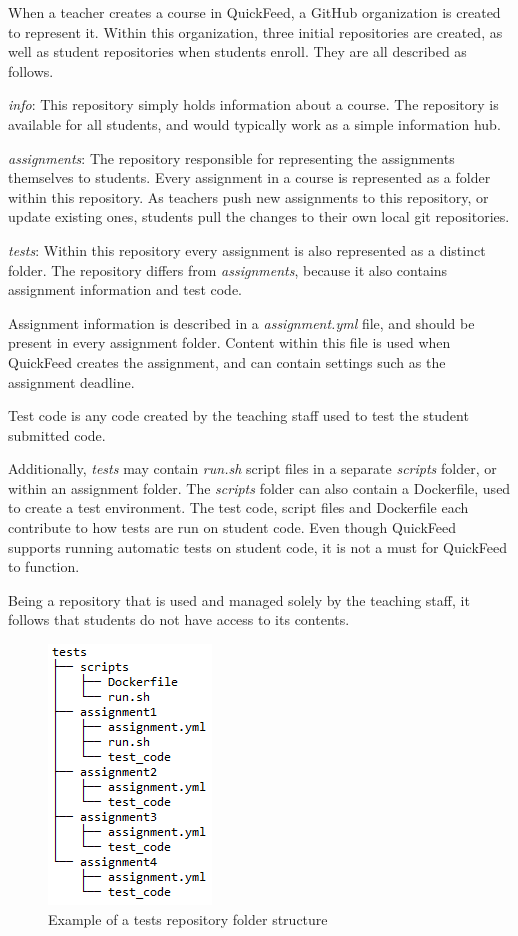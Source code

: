 When a teacher creates a course in QuickFeed, a GitHub organization is created to represent it.
Within this organization, three initial repositories are created, as well as student repositories when students enroll.
They are all described as follows.

\textit{info}: This repository simply holds information about a course.
The repository is available for all students, and would typically work as a simple information hub.

\textit{assignments}: The repository responsible for representing the assignments themselves to students.
Every assignment in a course is represented as a folder within this repository.
As teachers push new assignments to this repository, or update existing ones, students pull the changes to their own local git repositories.

\textit{tests}: Within this repository every assignment is also represented as a distinct folder.
The repository differs from \textit{assignments}, because it also contains assignment information and test code.

Assignment information is described in a \textit{assignment.yml} file, and should be present in every assignment folder.
Content within this file is used when QuickFeed creates the assignment, and can contain settings such as the assignment deadline.

Test code is any code created by the teaching staff used to test the student submitted code.

Additionally, \textit{tests} may contain \textit{run.sh} script files in a separate \textit{scripts} folder, or within an assignment folder.
The \textit{scripts} folder can also contain a Dockerfile, used to create a test environment.
The test code, script files and Dockerfile each contribute to how tests are run on student code.
Even though QuickFeed supports running automatic tests on student code, it is not a must for QuickFeed to function.

Being a repository that is used and managed solely by the teaching staff, it follows that students do not have access to its contents.

\begin{figure}[ht]
    \centering
    \includegraphics[scale=0.8]{photos/tests-repository-structure.PNG}
    \caption{Example of a tests repository folder structure}
    \label{fig:tests-repository-structure}
\end{figure}

